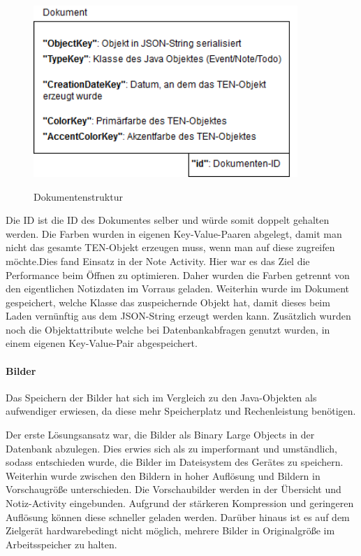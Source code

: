 \begin{figure}[H]
\centering
\begin{minipage}[t]{1\textwidth} %
\caption{Dokumentenstruktur} %
\includegraphics[width=10cm]{img/Dokumentenstruktur}\\ %
\end{minipage}
\end{figure}

Die ID ist die ID des Dokumentes selber und würde somit doppelt gehalten werden. Die Farben wurden in eigenen Key-Value-Paaren abgelegt, damit man nicht das gesamte TEN-Objekt erzeugen muss, wenn man auf diese zugreifen möchte.Dies fand Einsatz in der Note Activity. Hier war es das Ziel die Performance beim Öffnen zu optimieren. Daher wurden die Farben getrennt von den eigentlichen Notizdaten im Vorraus geladen. Weiterhin wurde im Dokument gespeichert, welche Klasse das zuspeichernde Objekt hat, damit dieses beim Laden vernünftig aus dem JSON-String erzeugt werden kann. Zusätzlich wurden noch die Objektattribute welche bei Datenbankabfragen genutzt wurden, in einem eigenen Key-Value-Pair abgespeichert.

\paragraph{Bilder}
Das Speichern der Bilder hat sich im Vergleich zu den Java-Objekten als aufwendiger erwiesen, da diese mehr Speicherplatz und Rechenleistung benötigen.

Der erste Lösungsansatz war, die Bilder als Binary Large Objects in der Datenbank abzulegen. Dies erwies sich als zu imperformant und umständlich, sodass entschieden wurde, die Bilder im Dateisystem des Gerätes zu speichern. Weiterhin wurde zwischen den Bildern in hoher Auflösung und Bildern in Vorschaugröße unterschieden. Die Vorschaubilder werden in der Übersicht und Notiz-Activity eingebunden. Aufgrund der stärkeren Kompression und geringeren Auflösung können diese schneller geladen werden. Darüber hinaus ist es auf dem Zielgerät hardwarebedingt nicht möglich, mehrere Bilder in Originalgröße im Arbeitsspeicher zu halten.

